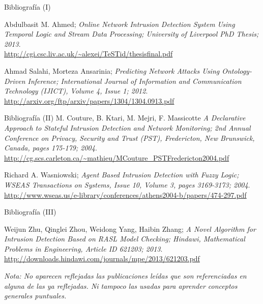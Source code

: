 \documentclass{beamer}
\begin{document}
\begin{thebibliography}{9}

\begin{frame}{Bibliografía (I)}

Abdulbasit M. Ahmed;
\emph{Online Network Intrusion Detection System Using Temporal Logic and Stream Data Processing; University of Liverpool PhD Thesis; 2013}.\\
\url{http://cgi.csc.liv.ac.uk/~alexei/TeSTid/thesisfinal.pdf}

Ahmad Salahi, Morteza Ansarinia;
\emph{Predicting Network Attacks Using Ontology-Driven Inference; International Journal of Information and Communication Technology (IJICT), Volume 4, Issue 1; 2012}.\\
\url{http://arxiv.org/ftp/arxiv/papers/1304/1304.0913.pdf}

\end{frame}

\begin{frame}{Bibliografía (II)}
M. Couture, B. Ktari, M. Mejri, F. Massicotte
\emph{A Declarative Approach to Stateful Intrusion Detection and Network Monitoring; 2nd Annual Conference on Privacy, Security and Trust (PST), Fredericton, New Brunswick, Canada, pages 175-179; 2004}.\\
\url{http://cg.scs.carleton.ca/~mathieu/MCouture_PSTFredericton2004.pdf}

Richard A. Wasniowski;
\emph{Agent Based Intrusion Detection with Fuzzy Logic; WSEAS Transactions on Systems, Issue 10, Volume 3, pages 3169-3173; 2004}.\\
\url{http://www.wseas.us/e-library/conferences/athens2004-b/papers/474-297.pdf}

\end{frame}

\begin{frame}{Bibliografía (III)}

Weijun Zhu, Qinglei Zhou, Weidong Yang, Haibin Zhang;
\emph{A Novel Algorithm for Intrusion Detection Based on RASL Model Checking; Hindawi, Mathematical Problems in Engineering, Article ID 621203; 2013}.\\
\url{http://downloads.hindawi.com/journals/mpe/2013/621203.pdf}

\vspace{2em}

\emph{Nota: No aparecen reflejadas las publicaciones leídas que son referenciadas en alguna de las ya reflejadas. Ni tampoco las usadas para aprender conceptos generales puntuales.}

\end{frame}

\end{thebibliography}
\end{document}
